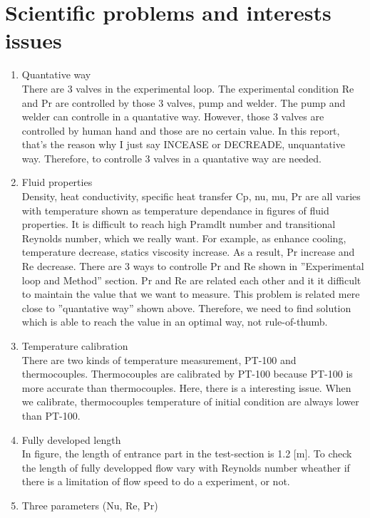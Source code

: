 \documentclass[conference]{IEEEtran}
\begin{document}
\section{Scientific problems and interests issues}
\begin{enumerate}
  \item Quantative way\\
  There are 3 valves in the experimental loop.
  The experimental condition Re and Pr are controlled by those 3 valves, pump and welder.
  The pump and welder can controlle in a quantative way.
  However, those 3 valves are controlled by human hand and those are no certain value.
  In this report, that's the reason why I just say INCEASE or DECREADE, unquantative way.
  Therefore, to controlle 3 valves in a quantative way are needed.
  \item Fluid properties\\
  Density, heat conductivity, specific heat transfer Cp, nu, mu, Pr are all varies with temperature shown as temperature dependance in figures of fluid properties.
  It is difficult to reach high Pramdlt number and transitional Reynolds number, which we really want.
  For example, as enhance cooling, temperature decrease, statics viscosity increase.
  As a result, Pr increase and Re decrease.
  There are 3 ways to controlle Pr and Re shown in ''Experimental loop and Method'' section.
  Pr and Re are related each other and it it difficult to maintain the value that we want to measure.
  This problem is related mere close to ''quantative way'' shown above.
  Therefore, we need to find solution which is able to reach the value in an optimal way, not rule-of-thumb.
  \item Temperature calibration\\
  There are two kinds of temperature measurement, PT-100 and thermocouples.
  Thermocouples are calibrated by PT-100 because PT-100 is more accurate than thermocouples.
  Here, there is a interesting issue.
  When we calibrate, thermocouples temperature of initial condition are always lower than PT-100.
  \item Fully developed length\\
  In figure\label{thermal_boundary_layer_development}, the length of entrance part in the test-section is 1.2 [m].
  To check the length of fully developped flow vary with Reynolds number wheather if there is a limitation of
flow speed to do a experiment, or not.
  \item Three parameters (Nu, Re, Pr)\\

\end{enumerate}
\end{document}

